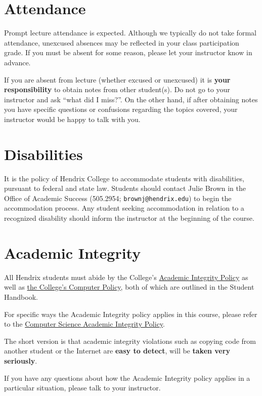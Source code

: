 \documentclass{article}
\begin{document}
\section*{Attendance}

Prompt lecture attendance is expected.  Although we typically do not
take formal attendance, unexcused absences may be reflected in your
class participation grade.  If you must be absent for some reason,
please let your instructor know in advance.

If you are absent from lecture (whether excused or unexcused) it is
\textbf{your responsibility} to obtain notes from other student(s).
Do not go to your instructor and ask ``what did I miss?''. On the
other hand, if after obtaining notes you have specific questions or
confusions regarding the topics covered, your instructor would be
happy to talk with you.

\section*{Disabilities}

It is the policy of Hendrix College to accommodate students with
disabilities, pursuant to federal and state law. Students should
contact Julie Brown in the Office of Academic Success (505.2954;
\texttt{brownj@hendrix.edu}) to begin the accommodation process. Any
student seeking accommodation in relation to a recognized disability
should inform the instructor at the beginning of the course.

\section*{Academic Integrity}

All Hendrix students must abide by the College's
\href{https://www.hendrix.edu/studentlife/handbook.aspx?id=67121}{Academic
Integrity Policy} as well as
\href{https://www.hendrix.edu/studentlife/handbook.aspx?id=42308}{the
College's Computer Policy}, both of which are outlined in the Student
Handbook.

For specific ways the Academic Integrity policy applies in this
course, please refer to the
\href{http://ozark.hendrix.edu/~yorgey/ac-integrity-policy.html}{Computer
  Science Academic Integrity Policy}.

The short version is that academic integrity violations such as
copying code from another student or the Internet are \textbf{easy to
  detect}, will be \textbf{taken
very seriously}.

If you have any questions about how the Academic Integrity policy
applies in a particular situation, please talk to your instructor.
\end{document}
